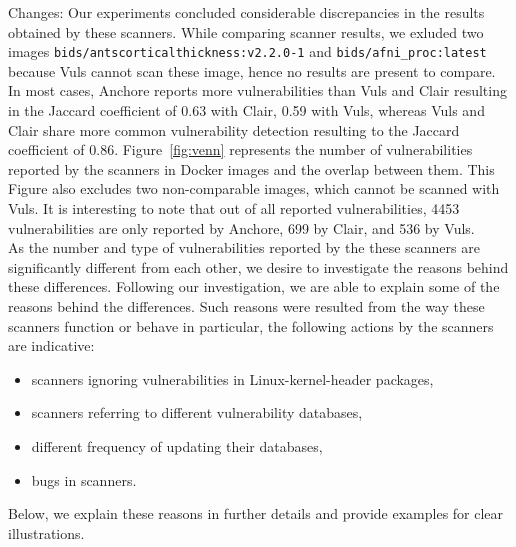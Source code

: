 \documentclass[a4paper,num-refs]{oup-contemporary}
\newcommand{\change}[2]{\color{cyan}Changes: #1\color{black}}
\begin{document}
\change{Our experiments concluded considerable discrepancies in the results obtained by
these scanners. %
While comparing scanner results, we exluded two images \texttt{bids/antscorticalthickness:v2.2.0-1} and
\texttt{bids/afni\_proc:latest} because Vuls
cannot scan these image, hence no results are present to compare.
In most cases,
Anchore reports more vulnerabilities than Vuls and Clair resulting in 
the Jaccard coefficient of 0.63 with Clair, 0.59 with Vuls,
whereas Vuls and Clair share more common vulnerability detection resulting to the Jaccard coefficient of 0.86.
Figure~\ref{fig:venn} represents the number of vulnerabilities reported by
the scanners in Docker images and the overlap between them.
This Figure also excludes two non-comparable images, which cannot be scanned with Vuls.
It is interesting to note that out of all reported vulnerabilities, 4453 vulnerabilities are only
reported by Anchore, 699 by Clair, and 536 by Vuls.}
\newline\\
As the number and type of vulnerabilities reported by the these scanners are significantly different from each other,
we desire to investigate the reasons behind these differences.
Following our investigation, we are able to explain some of the reasons behind
the differences. 
Such reasons were resulted from the way these scanners function or behave 
in particular, the following actions by the scanners are indicative:
\begin{itemize}
   \item scanners ignoring vulnerabilities in Linux-kernel-header packages,
   \item scanners referring to different vulnerability databases,
   \item different frequency of updating their databases,
   \item bugs in scanners. 
\end{itemize}

Below, we explain these reasons in further details and provide examples
for clear illustrations.
\end{document}
